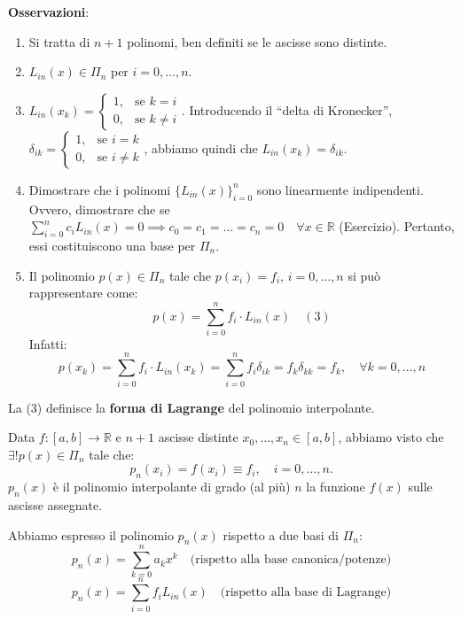 \textbf{Osservazioni}:
\begin{enumerate}
    \item Si tratta di $n+1$ polinomi, ben definiti se le ascisse sono distinte.
    \item $L_{in}(x) \in \Pi_n$ per $i=0,\dots,n$.
    \item $L_{in}(x_k) = \begin{cases} 1, & \text{se } k=i \\ 0, & \text{se } k \neq i \end{cases}$.   \newline
    Introducendo il ``delta di Kronecker'', $\delta_{ik} = \begin{cases} 1, & \text{se } i=k \\ 0, & \text{se } i \neq k \end{cases}$, abbiamo quindi che $L_{in}(x_k) = \delta_{ik}$.
    \item Dimostrare che i polinomi $\{L_{in}(x)\}_{i=0}^{n}$ sono linearmente indipendenti. Ovvero, dimostrare che se $\sum_{i=0}^{n} c_i L_{in}(x) = 0 \implies c_0 = c_1 = \dots = c_n = 0 \quad \forall x \in \mathbb{R}$ (Esercizio). Pertanto, essi costituiscono una base per $\Pi_n$.
    \item Il polinomio $p(x) \in \Pi_n$ tale che $p(x_i) = f_i$, $i=0,\dots,n$ si può rappresentare come:
    $$p(x) = \sum_{i=0}^{n} f_i \cdot L_{in}(x) \quad (3)$$
    Infatti:
    $$p(x_k) = \sum_{i=0}^{n} f_i \cdot L_{in}(x_k) = \sum_{i=0}^{n} f_i \delta_{ik} = f_k \delta_{kk} = f_k, \quad \forall k=0,\dots,n$$
\end{enumerate}

\begin{definition}
La (3) definisce la \textbf{forma di Lagrange} del polinomio interpolante.
\end{definition}



Data $f:[a,b]\rightarrow \mathbb{R}$ e $n+1$ ascisse distinte $x_0, \dots, x_n \in [a,b]$, abbiamo visto che $\exists! p(x) \in \Pi_n$ tale che:
$$p_n(x_i) = f(x_i) \equiv f_i, \quad i=0,\dots,n.$$
$p_n(x)$ è il polinomio interpolante di grado (al più) $n$ la funzione $f(x)$ sulle ascisse assegnate.

Abbiamo espresso il polinomio $p_n(x)$ rispetto a due basi di $\Pi_n$:
$$p_n(x) = \sum_{k=0}^{n} a_k x^k \quad \text{(rispetto alla base canonica/potenze)}$$
$$p_n(x) = \sum_{i=0}^{n} f_i L_{in}(x) \quad \text{(rispetto alla base di Lagrange)}$$

